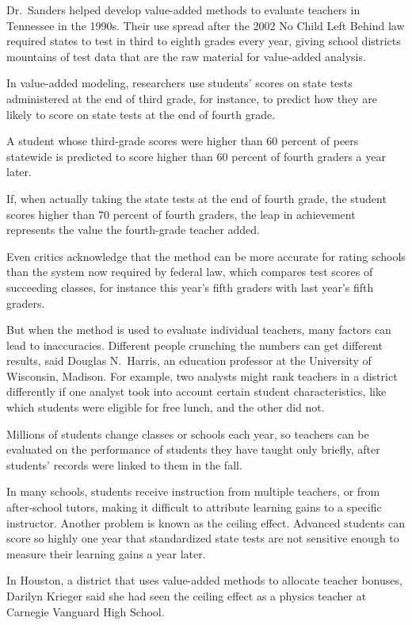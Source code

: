 ﻿\documentclass[12pt]{article}
\begin{document}
Dr.~Sanders helped develop value-added methods to evaluate teachers in Tennessee in the 1990s. Their
use spread after the 2002 No Child Left Behind law required states to test in third to eighth grades
every year, giving school districts mountains of test data that are the raw material for value-added
analysis.

In value-added modeling, researchers use students' scores on state tests administered at the end of
third grade, for instance, to predict how they are likely to score on state tests at the end of
fourth grade.

A student whose third-grade scores were higher than 60 percent of peers statewide is predicted to
score higher than 60 percent of fourth graders a year later.

If, when actually taking the state tests at the end of fourth grade, the student scores higher than
70 percent of fourth graders, the leap in achievement represents the value the fourth-grade teacher
added.

Even critics acknowledge that the method can be more accurate for rating schools than the system now
required by federal law, which compares test scores of succeeding classes, for instance this year's
fifth graders with last year's fifth graders.

But when the method is used to evaluate individual teachers, many factors can lead to inaccuracies.
Different people crunching the numbers can get different results, said Douglas N.~Harris, an
education professor at the University of Wisconsin, Madison. For example, two analysts might rank
teachers in a district differently if one analyst took into account certain student characteristics,
like which students were eligible for free lunch, and the other did not.

Millions of students change classes or schools each year, so teachers can be evaluated on the
performance of students they have taught only briefly, after students' records were linked to them
in the fall.

In many schools, students receive instruction from multiple teachers, or from after-school tutors,
making it difficult to attribute learning gains to a specific instructor. Another problem is known
as the ceiling effect. Advanced students can score so highly one year that standardized state tests
are not sensitive enough to measure their learning gains a year later.

In Houston, a district that uses value-added methods to allocate teacher bonuses, Darilyn Krieger
said she had seen the ceiling effect as a physics teacher at Carnegie Vanguard High School.
\end{document}
